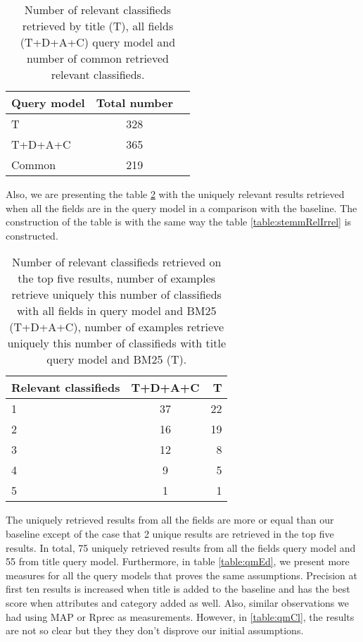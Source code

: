 \begin{table}[H]
\begin{center}
\caption{Number of relevant classifieds retrieved by title (T), all fields (T+D+A+C) query model and number of common retrieved relevant classifieds.}
\label{table:tVsEnt}
\begin{tabular}{lcr}
\midrule
 Query model &  Total number \\
\midrule
	T & 328 \\
	T+D+A+C & 365 \\
	Common & 219 \\
\bottomrule
\end{tabular}
\end{center}
\end{table}

Also, we are presenting the table \ref{table:allVST} with the uniquely relevant results retrieved when all the fields are in the query model in a comparison with the baseline.  The construction of the table is with the same way the table \ref{table:stemmRelIrrel} is constructed.


\begin{table}[H]
\begin{center}
\caption{Number of relevant classifieds retrieved on the top five results, number of examples retrieve uniquely this number of classifieds with all fields in query model and BM25 (T+D+A+C), number of examples retrieve uniquely this number of classifieds with title query model and BM25 (T).}
\label{table:allVST}

\begin{tabular}{lcr}
\midrule
Relevant classifieds &  T+D+A+C & T \\
\midrule
	1 & 37 & 22 \\
	2 & 16 & 19 \\
	3 & 12 & 8 \\
	4 & 9 & 5  \\
	5 & 1 & 1 \\
\bottomrule
\end{tabular}
\end{center}
\end{table}




The uniquely retrieved results from all the fields are more or equal than our baseline except of the case that 2 unique results are retrieved in the top five results. In total, 75 uniquely retrieved results from all the fields query model and 55 from title query model. Furthermore, in table \ref{table:qmEd}, we present more measures for all the query models that proves the same assumptions. Precision at first ten results is increased when title is added to the baseline and has the best score when attributes and category added as well. Also, similar observations we had using MAP or Rprec as measurements. However, in \ref{table:qmCl}, the results are not so clear but they they don't disprove our initial assumptions.

